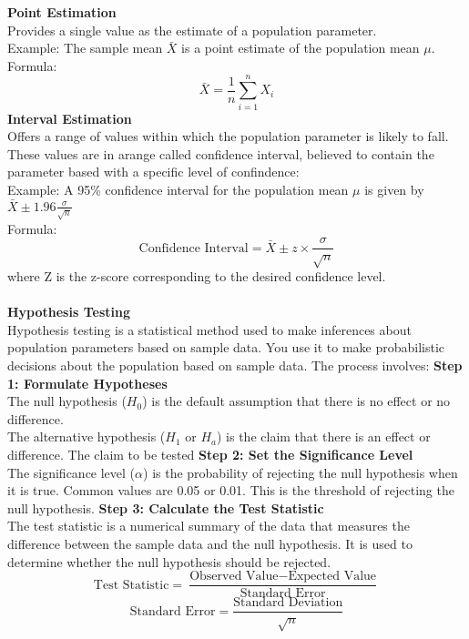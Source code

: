 \documentclass[a3paper,12pt]{extarticle} %
\begin{document}
    \subitem \textbf{Point Estimation} 
    \\ Provides a single value as the estimate of a population parameter. 
    \\ Example: The sample mean \(\bar{X}\) is a point estimate of the population mean \(\mu\).
    \\ Formula:
    \[
    \bar{X} = \frac{1}{n}\sum_{i=1}^{n}X_i
    \]
    \subitem \textbf{Interval Estimation}
    \\ Offers a range of values within which the population parameter is likely to fall. These values are in arange called confidence interval, believed to contain the parameter based with a specific level of confindence:
    \\ Example: A 95\% confidence interval for the population mean \(\mu\) is given by \(\bar{X} \pm 1.96\frac{\sigma}{\sqrt{n}}\)
    \\ Formula:
    \[
    \text{Confidence Interval} = \bar{X} \pm z \times \frac{\sigma}{\sqrt{n}}
    \]
    where Z is the z-score corresponding to the desired confidence level.
    \\ \\ \subitem \textbf{Hypothesis Testing}
    \\ Hypothesis testing is a statistical method used to make inferences about population parameters based on sample data. You use it to make probabilistic decisions about the population based on sample data. The process involves:
    \subitem \textbf{Step 1: Formulate Hypotheses}
    \\ The null hypothesis (\(H_0\)) is the default assumption that there is no effect or no difference. 
    \\ The alternative hypothesis (\(H_1\) or \(H_a\)) is the claim that there is an effect or difference. The claim to be tested
    \subitem \textbf{Step 2: Set the Significance Level}
    \\ The significance level (\(\alpha\)) is the probability of rejecting the null hypothesis when it is true. Common values are 0.05 or 0.01. This is the threshold of rejecting the null hypothesis.
    \subitem \textbf{Step 3: Calculate the Test Statistic}
    \\ The test statistic is a numerical summary of the data that measures the difference between the sample data and the null hypothesis. It is used to determine whether the null hypothesis should be rejected.
    \[
    \text{Test Statistic} = \frac{\text{Observed Value} - \text{Expected Value}}{\text{Standard Error}}
    \]
    \[
    \text{Standard Error} = \frac{\text{Standard Deviation}}{\sqrt{n}}
    \]
\end{document}
